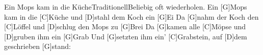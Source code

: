 \documentclass[../main.tex]{subfiles}
\begin{document}
\begin{songwithoutpagebreak}{Ein Mops kam in die Küche}{Traditionell}{Beliebig oft wiederholen.}
Ein [G]Mops kam in die [C]Küche und [D]stahl dem Koch ein [G]Ei
Da [G]nahm der Koch den [C]Löffel und [D]schlug den Mops zu [G]Brei
Da [G]kamen alle [C]Möpse und [D]gruben ihm ein [G]Grab
Und [G]setzten ihm ein' [C]Grabstein, auf [D]dem geschrieben [G]stand:
\end{songwithoutpagebreak}
\end{document}
